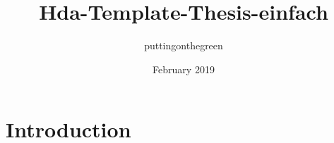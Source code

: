 \documentclass{article}
\title{Hda-Template-Thesis-einfach}
\author{puttingonthegreen }
\date{February 2019}
\begin{document}
\maketitle

\section{Introduction}
\end{document}
